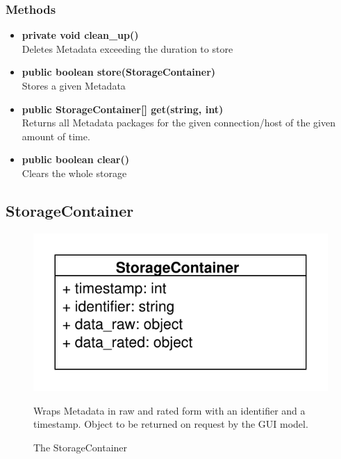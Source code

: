 \subsubsection{Methods}
\begin{itemize}
	\item \textbf{private void clean\_up()}\\
	Deletes Metadata exceeding the duration to store
	\item \textbf{public boolean store(StorageContainer)}\\
	Stores a given Metadata
	\item \textbf{public StorageContainer[] get(string, int)}\\
	Returns all Metadata packages for the given connection/host of the given amount of time.
	\item \textbf{public boolean clear()}\\
	Clears the whole storage
\end{itemize}

\newpage
\subsection{StorageContainer}
\begin{figure}[htbp]
	\begin{minipage}[t]{7cm}
		\vspace{0pt}
		\centering
		\includegraphics[scale=0.6]{./diagram_pictures/StorageContainer.pdf}
		\caption{The StorageContainer}
	\end{minipage}
	\hfill
	\begin{minipage}[t]{8cm}
		\vspace{10pt}
		Wraps Metadata in raw and rated form with an identifier and a timestamp. Object to be returned on request by the GUI model.
	\end{minipage}
\end{figure}

